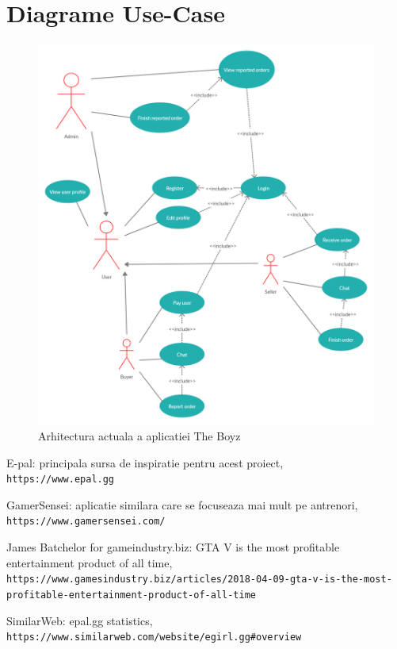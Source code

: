 \documentclass{article}
\begin{document}
\section{Diagrame Use-Case}

\begin{figure}[ht]
\centering
\includegraphics[width=1\textwidth]{img/use-case.png}
\caption{Arhitectura actuala a aplicatiei The Boyz} 
\label{fig:architecture}
\end{figure}

\begin{thebibliography}{9}

E-pal: principala sursa de inspiratie pentru acest proiect,
\\\texttt{https://www.epal.gg}

GamerSensei: aplicatie similara care se focuseaza mai mult pe antrenori,
\\\texttt{https://www.gamersensei.com/}

James Batchelor for gameindustry.biz: GTA V is the most profitable entertainment product of all time,
\\\texttt{https://www.gamesindustry.biz/articles/2018-04-09-gta-v-is-the-most-profitable-entertainment-product-of-all-time}

SimilarWeb: epal.gg statistics,
\\\texttt{https://www.similarweb.com/website/egirl.gg\#overview}

\end{thebibliography}
\end{document}
